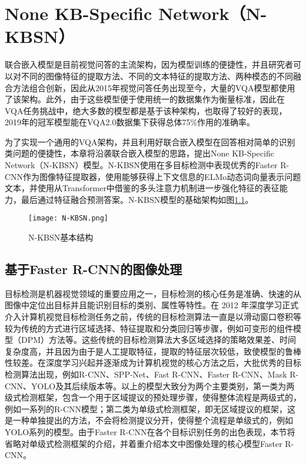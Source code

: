 
\chapter{None KB-Specific Network（N-KBSN）}
联合嵌入模型是目前视觉问答的主流架构，因为模型训练的便捷性，并且研究者可以对不同的图像特征的提取方法、不同的文本特征的提取方法、两种模态的不同融合方法组合创新，因此从2015年视觉问答任务出现至今，大量的VQA模型都使用了该架构。此外，由于这些模型便于使用统一的数据集作为衡量标准，因此在VQA任务挑战中，绝大多数的模型都是基于该种架构，也取得了较好的表现，2019年的冠军模型能在VQA2.0数据集下获得总体75\%作用的准确率。

为了实现一个通用的VQA架构，并且利用好联合嵌入模型在回答相对简单的识别类问题的便捷性，本章将沿袭联合嵌入模型的思路，提出None KB-Specific Network（N-KBSN）模型。N-KBSN使用在多目标检测中表现优秀的Faster R-CNN作为图像特征提取器，使用能够获得上下文信息的ELMo动态词向量表示问题文本，并使用从Transformer中借鉴的多头注意力机制进一步强化特征的表征能力，最后通过特征融合预测答案。N-KBSN模型的基础架构如图\ref{N-KBSN}。
\begin{figure}[H]
	\texttt{[image: N-KBSN.png]}
	\caption{N-KBSN基本结构}
	\label{N-KBSN}
\end{figure}

\section{基于Faster R-CNN的图像处理}
目标检测是机器视觉领域的重要应用之一，目标检测的核心任务是准确、快速的从图像中定位出目标并且能识别目标的类别、属性等特性。在 2012 年深度学习正式介入计算机视觉目标检测任务之前，传统的目标检测算法一直是以滑动窗口卷积等较为传统的方式进行区域选择、特征提取和分类回归等步骤，例如可变形的组件模型（DPM）方法等。这些传统的目标检测算法大多区域选择的策略效果差、时间复杂度高，并且因为由于是人工提取特征，提取的特征层次较低，致使模型的鲁棒性较差。在深度学习兴起并逐渐成为计算机视觉的核心方法之后，大批优秀的目标检测算法出现，例如R-CNN、SPP-Net、Fast R-CNN、Faster R-CNN、Mask R-CNN、YOLO及其后续版本等。以上的模型大致分为两个主要类别，第一类为两级式检测框架，包含一个用于区域提议的预处理步骤，使得整体流程是两级式的，例如一系列的R-CNN模型；第二类为单级式检测框架，即无区域提议的框架，这是一种单独提出的方法，不会将检测提议分开，使得整个流程是单级式的，例如YOLO系列的模型。由于Faster R-CNN在各个目标识别任务的出色表现，本节将省略对单级式检测框架的介绍，并着重介绍本文中图像处理的核心模型Faster R-CNN。

